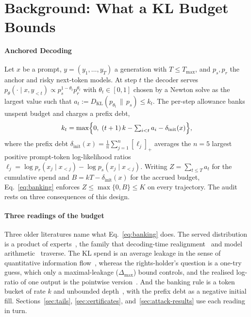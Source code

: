 \section{Background: What a KL Budget Bounds}\label{sec:background}

\paragraph{Anchored Decoding}
Let $x$ be a prompt, $y = (y_1, \dots, y_T)$ a generation with $T \le T_{\max}$, and $p_s, p_r$ the anchor and risky next-token models. At step $t$ the decoder serves $p_\theta(\cdot \mid x, y_{<t}) \propto p_s^{1-\theta_t} p_r^{\theta_t}$ with $\theta_t \in [0,1]$ chosen by a Newton solve as the largest value such that $a_t := D_{\mathrm{KL}}(p_{\theta_t} \,\|\, p_s) \le k_t$. The per-step allowance banks unspent budget and charges a prefix debt,
\begin{equation}
k_t = \max\Bigl\{0,\; (t+1)\,k - \textstyle\sum_{i<t} a_i - \delta_{\mathrm{init}}(x)\Bigr\},
\label{eq:banking}
\end{equation}
where the prefix debt $\delta_{\mathrm{init}}(x) = \frac{1}{n}\sum_{j=1}^{n} [\ell_j]_+$ averages the $n = 5$ largest positive prompt-token log-likelihood ratios $\ell_j = \log p_r(x_j \mid x_{<j}) - \log p_s(x_j \mid x_{<j})$. Writing $Z = \sum_{t \le T} a_t$ for the cumulative spend and $B = kT - \delta_{\mathrm{init}}(x)$ for the accrued budget, Eq.~\eqref{eq:banking} enforces $Z \le \max\{0, B\} \le K$ on every trajectory. The audit rests on three consequences of this design.

\paragraph{Three readings of the budget}
Three older literatures name what Eq.~\eqref{eq:banking} does. The served distribution is a product of experts~\cite{hinton2002poe}, the family that decoding-time realignment~\cite{liu2024dera} and model arithmetic~\cite{dekoninck2024arithmetic} traverse. The KL spend is an average leakage in the sense of quantitative information flow~\cite{smith2009foundations,issa2020operational}, whereas the rights-holder's question is a one-try guess, which only a maximal-leakage ($\Delta_{\max}$) bound controls, and the realised log-ratio of one output is the pointwise version~\cite{saeidian2023pointwise}. And the banking rule is a token bucket of rate $k$ and unbounded depth~\cite{turner1986leaky}, with the prefix debt as a negative initial fill. Sections~\ref{sec:tails}, \ref{sec:certificates}, and~\ref{sec:attack-results} use each reading in turn.

